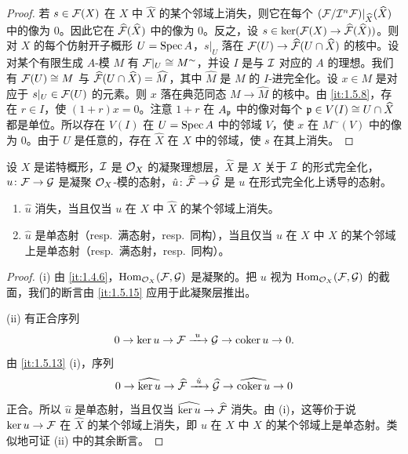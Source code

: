 \begin{proof}
若 $s\in\mathcal{F}(X)$ 在 $X$ 中 $\widehat X$ 的某个邻域上消失，则它在每个 $(\mathcal{F}/\mathcal{I}^n\mathcal{F})|_{\widehat X}(\widehat X)$ 中的像为 $0$。因此它在 $\widehat{\mathcal{F}}(\widehat X)$ 中的像为 $0$。反之，设 $s\in\ker(\mathcal{F}(X)\to\widehat{\mathcal{F}}(\widehat X))$。则对 $X$ 的每个仿射开子概形 $U=\operatorname{Spec} A$，$s|_U$ 落在 $\mathcal{F}(U)\to\widehat{\mathcal{F}}(U\cap\widehat X)$ 的核中。设对某个有限生成 $A$-模 $M$ 有 $\mathcal{F}|_U\cong M^{\sim}$，并设 $I$ 是与 $\mathcal{I}$ 对应的 $A$ 的理想。我们有 $\mathcal{F}(U)\cong M$ 与 $\widehat{\mathcal{F}}(U\cap\widehat X)=\widehat M$，其中 $\widehat M$ 是 $M$ 的 $I$-进完全化。设 $x\in M$ 是对应于 $s|_U\in\mathcal{F}(U)$ 的元素。则 $x$ 落在典范同态 $M\to\widehat M$ 的核中。由 \ref{it:1.5.8}，存在 $r\in I$，使 $(1+r)x=0$。注意 $1+r$ 在 $A_{\mathfrak{p}}$ 中的像对每个 $\mathfrak{p}\in V(I)\cong U\cap\widehat X$ 都是单位。所以存在 $V(I)$ 在 $U=\operatorname{Spec} A$ 中的邻域 $V$，使 $x$ 在 $M^{\sim}(V)$ 中的像为 $0$。由于 $U$ 是任意的，存在 $\widehat X$ 在 $X$ 中的邻域，使 $s$ 在其上消失。
\end{proof}

\begin{corollary}\label{it:1.5.16}
设 $X$ 是诺特概形，$\mathcal{I}$ 是 $\mathcal{O}_X$ 的凝聚理想层，$\widehat X$ 是 $X$ 关于 $\mathcal{I}$ 的形式完全化，$u\colon\mathcal{F}\to\mathcal{G}$ 是凝聚 $\mathcal{O}_X$-模的态射，$\hat u\colon\widehat{\mathcal{F}}\to\widehat{\mathcal{G}}$ 是 $u$ 在形式完全化上诱导的态射。
\begin{enumerate}[label=(\roman*),leftmargin=2.8em]
  \item $\hat u$ 消失，当且仅当 $u$ 在 $X$ 中 $\widehat X$ 的某个邻域上消失。
  \item $\hat u$ 是单态射（resp.\ 满态射，resp.\ 同构），当且仅当 $u$ 在 $X$ 中 $\widehat X$ 的某个邻域上是单态射（resp.\ 满态射，resp.\ 同构）。
\end{enumerate}
\end{corollary}

\begin{proof}
(i) 由 \ref{it:1.4.6}，$\operatorname{Hom}_{\mathcal{O}_X}(\mathcal{F},\mathcal{G})$ 是凝聚的。把 $u$ 视为 $\operatorname{Hom}_{\mathcal{O}_X}(\mathcal{F},\mathcal{G})$ 的截面，我们的断言由 \ref{it:1.5.15} 应用于此凝聚层推出。

(ii) 有正合序列
\[
0\to\ker u\to\mathcal{F}\xrightarrow{\ u\ }\mathcal{G}\to\operatorname{coker} u\to 0.
\]
由 \ref{it:1.5.13} (i)，序列
\[
0\to\widehat{\ker u}\to\widehat\cF\xrightarrow{\ \hat u\ }\widehat\cG\to\widehat{\coker u}\to 0
\]
正合。所以 $\hat u$ 是单态射，当且仅当 $\widehat{\ker u}\to\widehat{\mathcal{F}}$ 消失。由 (i)，这等价于说 $\ker u\to\mathcal{F}$ 在 $\widehat X$ 的某个邻域上消失，即 $u$ 在 $X$ 中 $\widehat X$ 的某个邻域上是单态射。类似地可证 (ii) 中的其余断言。
\end{proof}

